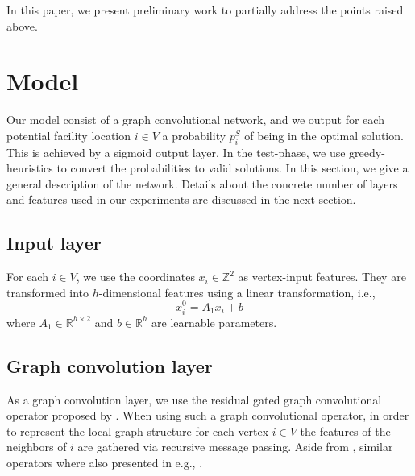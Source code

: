 \documentclass[]{article}
\begin{document}
In this paper, we present preliminary work to partially address the points raised above. 



\section{Model}

Our model consist of a graph convolutional network, and we output for each 
potential facility location $i\in V$ a probability $p^S_i$ of being in the 
optimal solution. This is achieved by a sigmoid output layer. In the 
test-phase, we use greedy-heuristics to convert the probabilities to valid 
solutions. In this section, we give a general description of the network. 
Details about the concrete number of layers and features used in our 
experiments are discussed in the next section.

\subsection{Input layer}

For each $i\in V$, we use the coordinates $x_i \in \mathbb Z^2$ as vertex-input 
features. They are transformed into $h$-dimensional features using a linear 
transformation, i.e.,
\begin{equation*}
x^0_{i}= A_1 x_i + b
\end{equation*}
where $A_1 \in \mathbb R^{h \times 2}$ and $b \in  \mathbb R^{h}$ are 
learnable parameters.

\subsection{Graph convolution layer}

As a graph convolution layer, we use the residual gated graph convolutional 
operator proposed by \cite{bresson2017residual}. When using such a graph 
convolutional operator, in order to represent 
the local graph structure for each vertex $i \in V$ the features of the 
neighbors of $i$ are gathered via recursive message passing. Aside from 
\cite{bresson2017residual}, similar operators 
where also presented in e.g., 
\cite{defferrard2016convolutional,li2015gated,kipf2016semi,hamilton2017inductive}.
 
\end{document}
